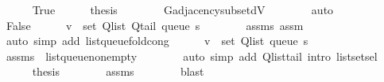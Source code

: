 \begin{isabellebody}
\ \ \ \ \isamarkupfalse%
\ True\isanewline
\ \ \ \ \isamarkupfalse%
\ {\isacharquery}{\kern0pt}thesis\isanewline
\ \ \ \ \ \ \isamarkupfalse%
\ G{\isachardot}{\kern0pt}adjacency{\isacharunderscore}{\kern0pt}subset{\isacharunderscore}{\kern0pt}dV\isanewline
\ \ \ \ \ \ \isamarkupfalse%
\ auto\isanewline
\ \ \isamarkupfalse%
\isanewline
\ \ \ \ \isamarkupfalse%
\ False\isanewline
\ \ \ \ \isamarkupfalse%
\ {\isachardoublequoteopen}v\ {\isasymin}\ set\ {\isacharparenleft}{\kern0pt}Q{\isacharunderscore}{\kern0pt}list\ {\isacharparenleft}{\kern0pt}Q{\isacharunderscore}{\kern0pt}tail\ {\isacharparenleft}{\kern0pt}queue\ s{\isacharparenright}{\kern0pt}{\isacharparenright}{\kern0pt}{\isacharparenright}{\kern0pt}{\isachardoublequoteclose}\isanewline
\ \ \ \ \ \ \isamarkupfalse%
\ assms\ assm\isanewline
\ \ \ \ \ \ \isamarkupfalse%
\ {\isacharparenleft}{\kern0pt}auto\ simp\ add{\isacharcolon}{\kern0pt}\ list{\isacharunderscore}{\kern0pt}queue{\isacharunderscore}{\kern0pt}fold{\isacharunderscore}{\kern0pt}cong{\isacharunderscore}{\kern0pt}{}{\isacharparenright}{\kern0pt}\isanewline
\ \ \ \ \isamarkupfalse%
\ {\isachardoublequoteopen}v\ {\isasymin}\ set\ {\isacharparenleft}{\kern0pt}Q{\isacharunderscore}{\kern0pt}list\ {\isacharparenleft}{\kern0pt}queue\ s{\isacharparenright}{\kern0pt}{\isacharparenright}{\kern0pt}{\isachardoublequoteclose}\isanewline
\ \ \ \ \ \ \isamarkupfalse%
\ assms{\isacharparenleft}{\kern0pt}{}{\isacharcomma}{\kern0pt}\ {}{\isacharparenright}{\kern0pt}\ list{\isacharunderscore}{\kern0pt}queue{\isacharunderscore}{\kern0pt}non{\isacharunderscore}{\kern0pt}empty\isanewline
\ \ \ \ \ \ \isamarkupfalse%
\ {\isacharparenleft}{\kern0pt}auto\ simp\ add{\isacharcolon}{\kern0pt}\ Q{\isachardot}{\kern0pt}list{\isacharunderscore}{\kern0pt}tail\ intro{\isacharcolon}{\kern0pt}\ list{\isachardot}{\kern0pt}set{\isacharunderscore}{\kern0pt}sel{\isacharparenleft}{\kern0pt}{}{\isacharparenright}{\kern0pt}{\isacharparenright}{\kern0pt}\isanewline
\ \ \ \ \isamarkupfalse%
\ {\isacharquery}{\kern0pt}thesis\isanewline
\ \ \ \ \ \ \isamarkupfalse%
\ assms{\isacharparenleft}{\kern0pt}{}{\isacharparenright}{\kern0pt}\isanewline
\ \ \ \ \ \ \isamarkupfalse%
\ blast\isanewline
\ \ \isamarkupfalse%
\isanewline
{}\isamarkupfalse%
%
\endisatagproof

\end{isabellebody}
